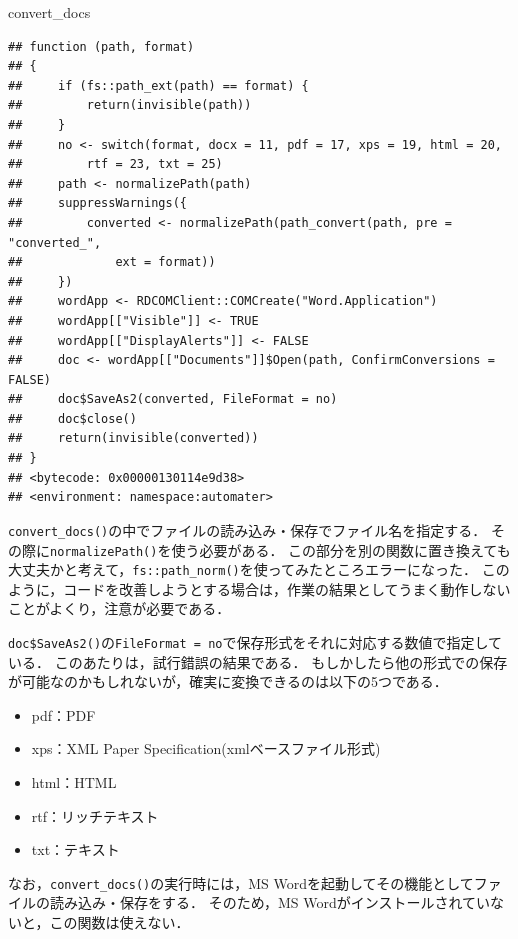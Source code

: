 \documentclass[
]{article}
\newenvironment{Shaded}{\begin{snugshade}}{\end{snugshade}}
\newcommand{\NormalTok}[1]{#1}
\providecommand{\tightlist}{%
  \setlength{\itemsep}{0pt}\setlength{\parskip}{0pt}}
\begin{document}
\begin{Shaded}
\begin{Highlighting}[]
\NormalTok{convert\_docs}
\end{Highlighting}
\end{Shaded}

\begin{verbatim}
## function (path, format) 
## {
##     if (fs::path_ext(path) == format) {
##         return(invisible(path))
##     }
##     no <- switch(format, docx = 11, pdf = 17, xps = 19, html = 20, 
##         rtf = 23, txt = 25)
##     path <- normalizePath(path)
##     suppressWarnings({
##         converted <- normalizePath(path_convert(path, pre = "converted_", 
##             ext = format))
##     })
##     wordApp <- RDCOMClient::COMCreate("Word.Application")
##     wordApp[["Visible"]] <- TRUE
##     wordApp[["DisplayAlerts"]] <- FALSE
##     doc <- wordApp[["Documents"]]$Open(path, ConfirmConversions = FALSE)
##     doc$SaveAs2(converted, FileFormat = no)
##     doc$close()
##     return(invisible(converted))
## }
## <bytecode: 0x00000130114e9d38>
## <environment: namespace:automater>
\end{verbatim}

\texttt{convert\_docs()}の中でファイルの読み込み・保存でファイル名を指定する．
その際に\texttt{normalizePath()}を使う必要がある．
この部分を別の関数に置き換えても大丈夫かと考えて，\texttt{fs::path\_norm()}を使ってみたところエラーになった．
このように，コードを改善しようとする場合は，作業の結果としてうまく動作しないことがよくり，注意が必要である．

\texttt{doc\$SaveAs2()}の\texttt{FileFormat\ =\ no}で保存形式をそれに対応する数値で指定している．
このあたりは，試行錯誤の結果である．
もしかしたら他の形式での保存が可能なのかもしれないが，確実に変換できるのは以下の5つである．

\begin{itemize}
\tightlist
\item
  pdf：PDF
\item
  xps：XML Paper Specification(xmlベースファイル形式)\\
\item
  html：HTML\\
\item
  rtf：リッチテキスト\\
\item
  txt：テキスト
\end{itemize}

なお，\texttt{convert\_docs()}の実行時には，MS Wordを起動してその機能としてファイルの読み込み・保存をする．
そのため，MS Wordがインストールされていないと，この関数は使えない．
\end{document}
